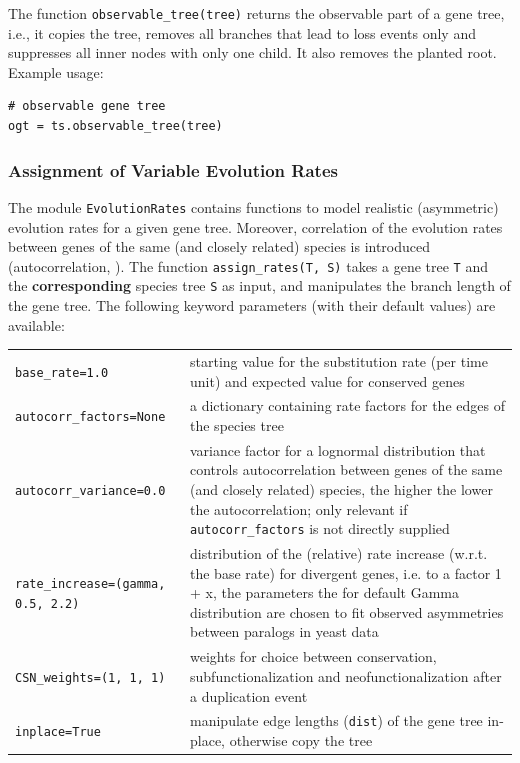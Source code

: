 \documentclass[hidelinks,11pt]{article}
\newcommand{\sq}{\textquotesingle}
\begin{document}
The function \texttt{observable\_tree(tree)} returns the observable part of a gene tree, i.e., it copies the tree, removes all branches that lead to loss events only and suppresses all inner nodes with only one child.
It also removes the planted root.
Example usage:
\begin{adjustwidth}{1cm}{1cm}\vspace{2mm}
\begin{verbatim}
# observable gene tree
ogt = ts.observable_tree(tree)
\end{verbatim}
\end{adjustwidth}


\subsubsection{Assignment of Variable Evolution Rates}
\label{sec:evolution_rates}

The module \texttt{EvolutionRates} contains functions to model realistic (asymmetric) evolution rates for a given gene tree.
Moreover, correlation of the evolution rates between genes of the same (and closely related) species is introduced (autocorrelation, \citep{kishino2001}).
The function \texttt{assign\_rates(T, S)} takes a gene tree \texttt{T} and the \textbf{corresponding} species tree \texttt{S} as input, and manipulates the branch length of the gene tree.
The following keyword parameters (with their default values) are available:

\vspace{3mm}
{\small\centering
\begin{longtable}{ p{4.0cm} p{9cm} }
	\texttt{base\_rate=1.0} & starting value for the substitution rate (per time unit) and expected value for conserved genes\\
	\texttt{autocorr\_factors=None}  & a dictionary containing rate factors for the edges of the species tree\\
	\texttt{autocorr\_variance=0.0}  & variance factor for a lognormal distribution that controls autocorrelation between genes of the same (and closely related) species, the higher the lower the auto\-corre\-la\-tion; only relevant if \texttt{autocorr\_factors} is not directly supplied\\
	\texttt{rate\_increase=\newline (\sq gamma\sq, 0.5, 2.2)}  & distribution of
	the (relative) rate increase (w.r.t. the
  base rate) for divergent genes, i.e. to a factor 1 + x, the parameters the
  for default Gamma distribution are chosen to fit observed asymmetries between
  paralogs in yeast data \citep{byrne2007}\\
	\texttt{CSN\_weights=(1, 1, 1)}  & weights for choice between conservation,
	subfunctionalization and neofunctionalization after a duplication event\\
	\texttt{inplace=True}  & manipulate edge lengths (\texttt{dist}) of the gene tree in-place, otherwise copy the tree\\
\end{longtable}
}
\vspace{3mm}
\end{document}
